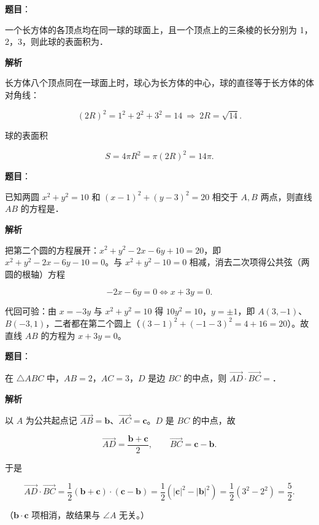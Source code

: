 \begin{answer}

\textbf{题目}：

一个长方体的各顶点均在同一球的球面上，且一个顶点上的三条棱的长分别为 1，2，3，则此球的表面积为\gkblank{}．

\textbf{解析}

长方体八个顶点同在一球面上时，球心为长方体的中心，球的直径等于长方体的体对角线：

\nopagebreak[4]
\[(2R)^2=1^2+2^2+3^2=14\ \Longrightarrow\ 2R=\sqrt{14}.\]

球的表面积

\nopagebreak[4]
\[S=4\pi R^2=\pi(2R)^2=14\pi .\]


\end{answer}
\begin{answer}

\textbf{题目}：

已知两圆 $x^2+y^2=10$ 和 $(x-1)^2+(y-3)^2=20$ 相交于 $A,B$ 两点，则直线 $AB$ 的方程是\gkblank{}．

\textbf{解析}

把第二个圆的方程展开：$x^2+y^2-2x-6y+10=20$，即 $x^2+y^2-2x-6y-10=0$。与 $x^2+y^2-10=0$ 相减，消去二次项得公共弦（两圆的根轴）方程

\nopagebreak[4]
\[-2x-6y=0\iff x+3y=0 .\]

代回可验：由 $x=-3y$ 与 $x^2+y^2=10$ 得 $10y^2=10$，$y=\pm1$，即 $A(3,-1)$、$B(-3,1)$，二者都在第二个圆上（$(3-1)^2+(-1-3)^2=4+16=20$）。故直线 $AB$ 的方程为 $x+3y=0$。


\end{answer}
\begin{answer}

\textbf{题目}：

在 $\triangle ABC$ 中，$AB=2$，$AC=3$，$D$ 是边 $BC$ 的中点，则 $\overrightarrow{AD}\cdot\overrightarrow{BC}=$\gkblank{}．

\textbf{解析}

以 $A$ 为公共起点记 $\overrightarrow{AB}=\boldsymbol b$、$\overrightarrow{AC}=\boldsymbol c$。$D$ 是 $BC$ 的中点，故

\nopagebreak[4]
\[\overrightarrow{AD}=\frac{\boldsymbol b+\boldsymbol c}{2},\qquad\overrightarrow{BC}=\boldsymbol c-\boldsymbol b .\]

于是

\nopagebreak[4]
\[\overrightarrow{AD}\cdot\overrightarrow{BC}=\frac12\left(\boldsymbol b+\boldsymbol c\right)\cdot\left(\boldsymbol c-\boldsymbol b\right)=\frac12\left(|\boldsymbol c|^2-|\boldsymbol b|^2\right)=\frac12\left(3^2-2^2\right)=\frac52 .\]

（$\boldsymbol b\cdot\boldsymbol c$ 项相消，故结果与 $\angle A$ 无关。）


\end{answer}

